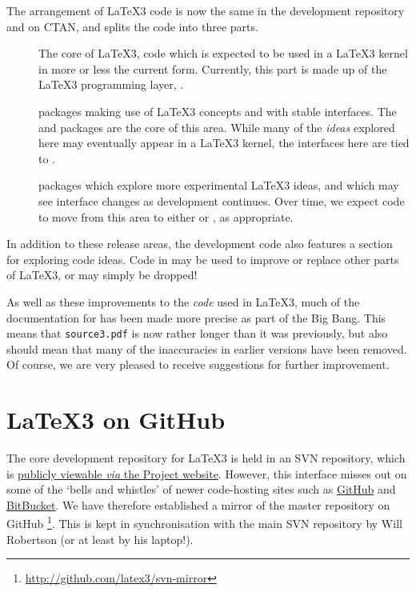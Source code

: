 \documentclass{ltnews}
\begin{document}
The arrangement of \LaTeX3 code is now the same in the development
repository and on CTAN, and splits the code into three parts.
\begin{description}
  \item[] The core of \LaTeX3, code which
    is expected to be used in a \LaTeX3 kernel in more or less the
    current form. Currently, this part is made up of the \LaTeX3
    programming layer, .
  \item[] \LaTeXe{} packages making use of \LaTeX3
    concepts and with stable interfaces. The  and
     packages are the core of this area. While many of
    the \emph{ideas} explored here may eventually appear in a \LaTeX3
    kernel, the interfaces here are tied to \LaTeXe{}.
  \item[] \LaTeXe{} packages which explore more
    experimental \LaTeX3 ideas, and which may see interface changes as
    development continues. Over time, we expect code to move from this area
    to either  or , as appropriate.
\end{description}

In addition to these release areas, the development code also features a
 section for exploring code ideas. Code in  may be
used to improve or replace other parts of \LaTeX3, or may simply be dropped!

As well as these improvements to the \emph{code} used in \LaTeX3, much of the
documentation for  has been made more precise as part of the Big
Bang. This means that \texttt{source3.pdf} is now rather longer than it was
previously, but also should mean that many of the inaccuracies in earlier
versions have been removed. Of course, we are very pleased to receive
suggestions for further improvement.

\section{\LaTeX3 on GitHub}

The core development repository for \LaTeX3 is held in an SVN repository, which
is \href{http://www.latex-project.org/code.html}{publicly viewable \emph{via}
the Project website}. However, this interface misses out on some of the `bells
and whistles' of newer code-hosting sites such as
\href{http://gitbug.com/}{GitHub} and \href{http://bitbucket.org/}{BitBucket}.
We have therefore established a mirror of the master repository on GitHub%
\footnote{\url{http://github.com/latex3/svn-mirror}}. This is kept in
synchronisation with the main SVN repository by Will Robertson (or at least
by his laptop!).
\end{document}
